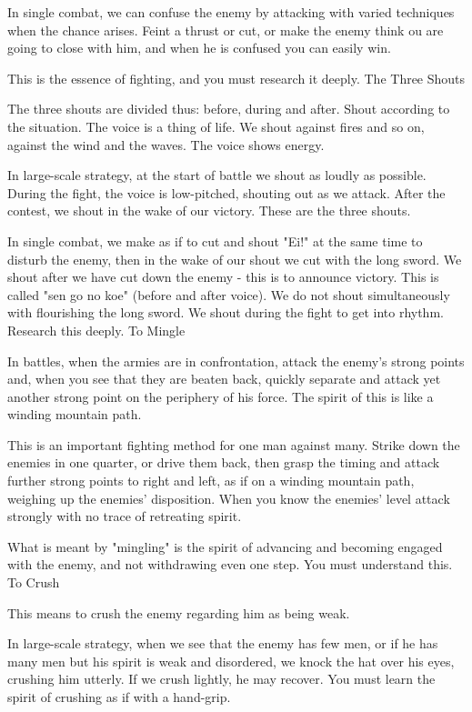 In single combat, we can confuse the enemy by attacking with varied techniques when the chance arises. Feint a thrust or cut, or make the enemy think ou are going to close with him, and when he is confused you can easily win.

This is the essence of fighting, and you must research it deeply.
The Three Shouts

The three shouts are divided thus: before, during and after. Shout according to the situation. The voice is a thing of life. We shout against fires and so on, against the wind and the waves. The voice shows energy.

In large-scale strategy, at the start of battle we shout as loudly as possible. During the fight, the voice is low-pitched, shouting out as we attack. After the contest, we shout in the wake of our victory. These are the three shouts.

In single combat, we make as if to cut and shout "Ei!" at the same time to disturb the enemy, then in the wake of our shout we cut with the long sword. We shout after we have cut down the enemy - this is to announce victory. This is called "sen go no koe" (before and after voice). We do not shout simultaneously with flourishing the long sword. We shout during the fight to get into rhythm. Research this deeply.
To Mingle

In battles, when the armies are in confrontation, attack the enemy's strong points and, when you see that they are beaten back, quickly separate and attack yet another strong point on the periphery of his force. The spirit of this is like a winding mountain path.

This is an important fighting method for one man against many. Strike down the enemies in one quarter, or drive them back, then grasp the timing and attack further strong points to right and left, as if on a winding mountain path, weighing up the enemies' disposition. When you know the enemies' level attack strongly with no trace of retreating spirit.

What is meant by "mingling" is the spirit of advancing and becoming engaged with the enemy, and not withdrawing even one step. You must understand this.
To Crush

This means to crush the enemy regarding him as being weak.

In large-scale strategy, when we see that the enemy has few men, or if he has many men but his spirit is weak and disordered, we knock the hat over his eyes, crushing him utterly. If we crush lightly, he may recover. You must learn the spirit of crushing as if with a hand-grip.

